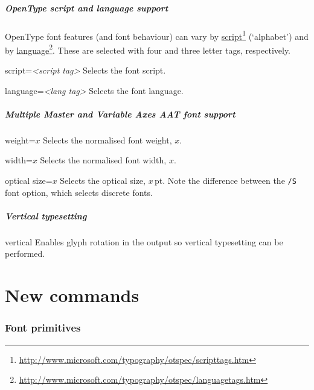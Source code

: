 \documentclass[12pt]{article}
\newenvironment{optdesc}
  {\begin{description}[font=\ttfamily,style=nextline,leftmargin=1.5cm]}
  {\end{description}}
\newcommand\hlink[2]{\href{#1}{#2}\footnote{\url{#1}}}
\begin{document}
\subsubsection{OpenType script and language support}

OpenType font features (and font behaviour) can vary by
\hlink{http://www.microsoft.com/typography/otspec/scripttags.htm}{script}
(`alphabet') and by
\hlink{http://www.microsoft.com/typography/otspec/languagetags.htm}{language}.
These are selected with four and three letter tags, respectively.

\begin{optdesc}
\item[script=\textsl{<script tag>}] Selects the font script.
\item[language=\textsl{<lang tag>}] Selects the font language.
\end{optdesc}

\subsubsection{Multiple Master and Variable Axes AAT font support}

\begin{optdesc}
\item[weight=$x$] Selects the normalised font weight, $x$.
\item[width=$x$] Selects the normalised font width, $x$.
\item[optical size=$x$] Selects the optical size, $x$\,pt. Note the
difference between the \texttt{/S} font option, which selects discrete
fonts.
\end{optdesc}

\subsubsection{Vertical typesetting}
\begin{optdesc}
\item[vertical] 
Enables glyph rotation in the output so vertical typesetting can be performed.
\end{optdesc}

\part{New commands}

\section{Font primitives}
\end{document}
